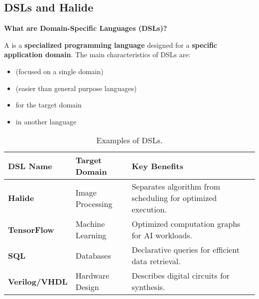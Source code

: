 \subsection{DSLs and Halide}

\begin{flushleft}
    \textcolor{Green3}{ \textbf{What are Domain-Specific Languages (DSLs)?}}
\end{flushleft}
A  is a \textbf{specialized programming language} designed for a \textbf{specific application domain}. The main characteristics of DSLs are:
\begin{itemize}
    \item {} (focused on a single domain)
    \item {} (easier than general purpose languages)
    \item {} for the target domain
    \item {} in another language
\end{itemize}

\begin{table}[!htp]
    \centering
    \begin{tabular}{@{} l l p{16em} @{}}
        \toprule
        \textbf{DSL Name} & \textbf{Target Domain} & \textbf{Key Benefits} \\
        \midrule
        \textbf{Halide}       & Image Processing   & Separates algorithm from scheduling for optimized execution. \\ [.5em]
        \textbf{TensorFlow}   & Machine Learning   & Optimized computation graphs for AI workloads. \\ [.5em]
        \textbf{SQL}          & Databases          & Declarative queries for efficient data retrieval. \\ [.5em]
        \textbf{Verilog/VHDL} & Hardware Design    & Describes digital circuits for synthesis. \\
        \bottomrule
    \end{tabular}
    \caption{Examples of DSLs.}
\end{table}

